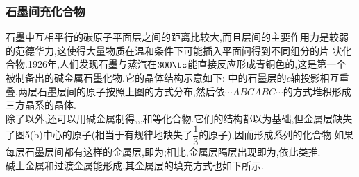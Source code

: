 \documentclass{ctexart}
\begin{document}
\subsubsection{石墨间充化合物}
石墨中互相平行的碳原子平面层之间的距离比较大,而且层间的主要作用力是较弱的范德华力,这使得大量物质在温和条件下可能插入平面问得到不同组分的片
状化合物.1926年,人们发现石墨与蒸汽在$300\tc$能直接反应形成青铜色的,这是第一个被制备出的碱金属石墨化物.它的晶体结构示意如下:
中的石墨层的$c$轴投影相互重叠,两层石墨层间的原子按照上图的方式分布,然后依$\cdots ABCABC\cdots$的方式堆积形成三方晶系的晶体.\\
\indent 除了以外,还可以用碱金属制得,,,和等化合物.它们的结构都以为基础,但金属层缺失了图5(b)中心的原子(相当于有规律地缺失了$\dfrac13$的原子),因而形成系列的化合物.如果每层石墨层间都有这样的金属层,即为;相比,金属层隔层出现即为,依此类推.\\
\indent 碱土金属和过渡金属能形成,其金属层的填充方式也如下所示.
\end{document}
